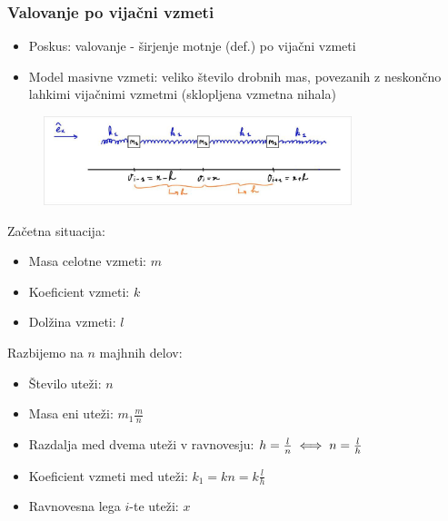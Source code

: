 \subsubsection*{Valovanje po vijačni vzmeti}
\begin{itemize}
    \item Poskus: valovanje - širjenje motnje (def.) po vijačni vzmeti
    \item Model masivne vzmeti: veliko število drobnih mas, povezanih z neskončno lahkimi vijačnimi vzmetmi (sklopljena vzmetna nihala)
\end{itemize}
\begin{figure}[h!]
    \centering
    \includegraphics[width=0.8\textwidth]{img/01_008.jpg}  
\end{figure}

Začetna situacija:
\begin{itemize}
    \item Masa celotne vzmeti: \(m\)
    \item Koeficient vzmeti: \(k\)
    \item Dolžina vzmeti: \(l\)
\end{itemize}

Razbijemo na \(n\) majhnih delov:
\begin{itemize}
    \item Število uteži: \(n\)
    \item Masa eni uteži: \(m_1 \frac{m}{n}\)
    \item Razdalja med dvema uteži v ravnovesju: \(h = \frac{l}{n} \iff n = \frac{l}{h}\)
    \item Koeficient vzmeti med uteži: \(k_1 = kn = k \frac{l}{h}\)
    \item Ravnovesna lega \(i\)-te uteži: \(x\)
\end{itemize}

